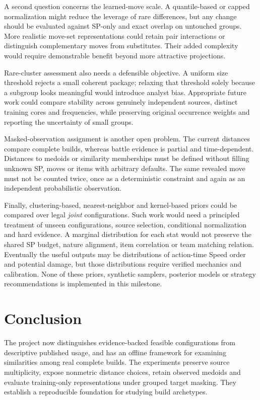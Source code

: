 \documentclass[10pt,a4paper]{article}
\begin{document}
A second question concerns the learned-move scale. A quantile-based or capped normalization might reduce the leverage of rare differences, but any change should be evaluated against SP-only and exact overlap on untouched groups. More realistic move-set representations could retain pair interactions or distinguish complementary moves from substitutes. Their added complexity would require demonstrable benefit beyond more attractive projections.

Rare-cluster assessment also needs a defensible objective. A uniform size threshold rejects a small coherent package; relaxing that threshold solely because a subgroup looks meaningful would introduce analyst bias. Appropriate future work could compare stability across genuinely independent sources, distinct training cores and frequencies, while preserving original occurrence weights and reporting the uncertainty of small groups.

Masked-observation assignment is another open problem. The current distances compare complete builds, whereas battle evidence is partial and time-dependent. Distances to medoids or similarity memberships must be defined without filling unknown SP, moves or items with arbitrary defaults. The same revealed move must not be counted twice, once as a deterministic constraint and again as an independent probabilistic observation.

Finally, clustering-based, nearest-neighbor and kernel-based priors could be compared over legal \emph{joint} configurations. Such work would need a principled treatment of unseen configurations, source selection, conditional normalization and hard evidence. A marginal distribution for each stat would not preserve the shared SP budget, nature alignment, item correlation or team matching relation. Eventually the useful outputs may be distributions of action-time Speed order and potential damage, but those distributions require verified mechanics and calibration. None of these priors, synthetic samplers, posterior models or strategy recommendations is implemented in this milestone.

\section{Conclusion}
The project now distinguishes evidence-backed feasible configurations from descriptive published usage, and has an offline framework for examining similarities among real complete builds. The experiments preserve source multiplicity, expose nonmetric distance choices, retain observed medoids and evaluate training-only representations under grouped target masking. They establish a reproducible foundation for studying build archetypes.
\end{document}
